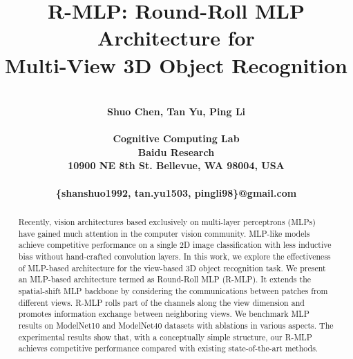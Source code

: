\documentclass[11pt]{article}
\begin{document}
\title{\bf R-MLP: Round-Roll MLP Architecture for\\ Multi-View 3D Object Recognition}

\author{\vspace{0.5in}\\\bf Shuo Chen, Tan Yu, Ping Li\\\\
Cognitive Computing Lab\\
Baidu Research \\
10900 NE 8th St. Bellevue, WA 98004, USA\\\\
\{shanshuo1992, tan.yu1503, pingli98\}@gmail.com
}

\date{}
\maketitle

\begin{abstract}\vspace{0.3in}

\noindent Recently, vision architectures based exclusively on multi-layer perceptrons (MLPs) have gained much attention in the computer vision community. MLP-like models achieve competitive performance on a single 2D image classification with less inductive bias without hand-crafted convolution layers. In this work, we explore the effectiveness of MLP-based architecture for the view-based 3D object recognition task. We present an MLP-based architecture termed as Round-Roll MLP (R-MLP). It extends the spatial-shift MLP backbone by considering the communications between patches from different views. R-MLP rolls part of the channels along the view dimension and promotes information exchange between neighboring views. We benchmark MLP results on ModelNet10 and ModelNet40 datasets with ablations in various aspects. The experimental results show that, with a conceptually simple structure, our R-MLP achieves competitive performance compared with existing state-of-the-art methods.\vspace{-0.1in}
\end{abstract}


\newpage
\end{document}
